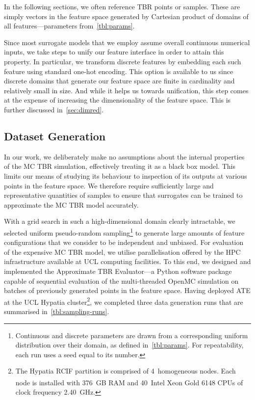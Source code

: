 In the following sections, we often reference TBR points or samples. These are simply vectors
in the feature space generated by Cartesian product of domains of all
features---parameters from~\cref{tbl:params}.

Since most surrogate models
that we employ assume overall continuous numerical inputs, we take steps to unify our
feature interface in order to attain this property. In particular, we transform
discrete features by embedding each such feature using standard one-hot
encoding. This option is available to
us since discrete domains that generate our feature space are finite in
cardinality and relatively small in size. And while it helps us towards
unification, this step comes at the expense of increasing the dimensionality of the
feature space. This is further discussed in~\cref{sec:dimred}.


\subsection{Dataset Generation}
\label{sec:dataset-generation}

In our work, we deliberately make no assumptions about the internal properties of the
MC TBR simulation, effectively treating it as a black box model. This limits our
means of studying its behaviour to inspection of its outputs at various
points in the feature space. We therefore require
sufficiently large and representative quantities of samples to ensure that
surrogates can be trained to approximate the MC TBR model accurately.

With a grid search in such a high-dimensional domain clearly intractable, we
selected uniform pseudo-random sampling\footnote{Continuous and discrete
parameters are drawn from a corresponding uniform distribution over their
domain, as defined in~\cref{tbl:params}. For repeatability, each run uses a seed equal to its number.} to generate large amounts of feature
configurations that we consider to be independent and unbiased. For evaluation
of the expensive MC TBR model, we utilise parallelisation offered by
the HPC infrastructure available at UCL computing facilities. To this end, we
designed and implemented the Approximate TBR Evaluator---a Python software package capable of
sequential evaluation of the multi-threaded OpenMC simulation on batches of
previously generated points in the feature space.
Having deployed ATE at the UCL Hypatia cluster\footnote{The Hypatia RCIF
	partition is comprised of 4~homogeneous nodes. Each node is installed with
	376~GB RAM and 40~Intel\textsuperscript{\textregistered}
	Xeon\textsuperscript{\textregistered} Gold 6148 CPUs of clock frequency
	2.40~GHz.}, we completed three data
generation runs that are summarised in~\cref{tbl:sampling-runs}.

